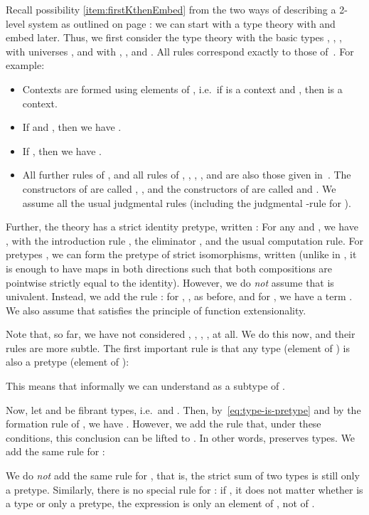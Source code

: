 \documentclass[a4paper,reqno]{amsart}
\theoremstyle{plain}
\theoremstyle{definition}
\begin{document}
Recall possibility \ref{item:firstKthenEmbed} from the two ways of describing a 2-level system as outlined on page \pageref{item:firstKthenEmbed}: we can start with a type theory with  and embed  later.
Thus, we first consider the type theory with the basic types , , , with universes , and with , , and .
All rules correspond exactly to those of~\cite[Appendix A.2]{HoTTbook}.
For example:
\begin{itemize}
 \item Contexts are formed using elements of , i.e.\ if  is a context and , then  is a context.
 \item If  and , then we have .
 \item If , then we have .
 \item All further rules of , and all rules of , , , , and  are also those given in~\cite[A.2.4--9]{HoTTbook}. 
 The constructors of  are called , , and the constructors of  are called  and .
 We assume all the usual judgmental rules (including the judgmental -rule for ).
\end{itemize}
Further, the theory has a strict identity pretype, written : For any  and , we have , with the introduction rule , the eliminator , and the usual computation rule. 
For pretypes , we can form the pretype of strict isomorphisms, written  (unlike in , it is enough to have maps in both directions such that both compositions are pointwise strictly equal to the identity).
However, we do \emph{not} assume that  is univalent. 
Instead, we add the rule : for , ,  as before, and for , we have a term . 
We also assume that  satisfies the principle of function extensionality.

Note that, so far, we have not considered , , , ,  at all.
We do this now, and their rules are more subtle.
The first important rule is that any type (element of ) is also a pretype (element of ):

This means that informally we can understand  as a subtype of .


Now, let  and  be fibrant types, i.e.\  and .
Then, by~\eqref{eq:type-is-pretype} and by the formation rule of , we have .
However, we add the rule that, under these conditions, this conclusion can be lifted to . 
In other words,  preserves types.
We add the same rule for :

We do \emph{not} add the same rule for , that is, the strict sum of two types is still only a pretype.
Similarly, there is no special rule for : if , it does not matter whether  is a type or only a pretype, the expression  is only an element of , not of .
\end{document}
